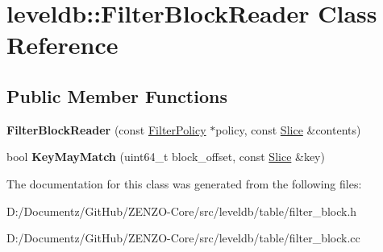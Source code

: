 \hypertarget{classleveldb_1_1_filter_block_reader}{}\section{leveldb\+::Filter\+Block\+Reader Class Reference}
\label{classleveldb_1_1_filter_block_reader}
\subsection*{Public Member Functions}
\begin{DoxyCompactItemize}
\item 
\mbox{\label{classleveldb_1_1_filter_block_reader_a02e9203af5314959ad99057f0020c406}} 
{\bfseries Filter\+Block\+Reader} (const \mbox{\hyperlink{classleveldb_1_1_filter_policy}{Filter\+Policy}} $\ast$policy, const \mbox{\hyperlink{classleveldb_1_1_slice}{Slice}} \&contents)
\item 
\mbox{\label{classleveldb_1_1_filter_block_reader_a2c1c0cd8311b99fd92d3548b7aa240d0}} 
bool {\bfseries Key\+May\+Match} (uint64\+\_\+t block\+\_\+offset, const \mbox{\hyperlink{classleveldb_1_1_slice}{Slice}} \&key)
\end{DoxyCompactItemize}


The documentation for this class was generated from the following files\+:\begin{DoxyCompactItemize}
\item 
D\+:/\+Documentz/\+Git\+Hub/\+Z\+E\+N\+Z\+O-\/\+Core/src/leveldb/table/filter\+\_\+block.\+h\item 
D\+:/\+Documentz/\+Git\+Hub/\+Z\+E\+N\+Z\+O-\/\+Core/src/leveldb/table/filter\+\_\+block.\+cc\end{DoxyCompactItemize}
